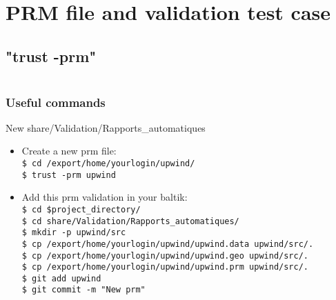\documentclass[10pt, hyperref={unicode=true,pdfusetitle, bookmarks=true,bookmarksnumbered=false,bookmarksopen=false, breaklinks=false,pdfborder={0 0 1},backref=true,colorlinks=true,linkcolor=darkblue,pageanchor, urlcolor=darkblue}]{beamer}
\begin{document}
\section{{\bf{PRM file and validation test case}}}
\subsection{{\bf{"trust -prm"}}}
\begin{frame}
\begin{columns}[c] 
\tableofcontents[sections={1-3},currentsection, currentsubsection]
\tableofcontents[sections={4-8},currentsection, currentsubsection]
\end{columns}
\end{frame}
\begin{frame}
\frametitle{Useful commands}
\begin{block}{New share/Validation/Rapports\_automatiques}
\begin{itemize}
\item Create a new prm file:\\
\texttt{\$ cd /export/home/yourlogin/upwind/}\\
\texttt{\$ trust -prm upwind}\\
\item Add this prm validation in your baltik:\\
\texttt{\$ cd \$project\_directory/}\\
\texttt{\$ cd share/Validation/Rapports\_automatiques/}\\
\texttt{\$ mkdir -p upwind/src}\\
\texttt{\$ cp /export/home/yourlogin/upwind/upwind.data upwind/src/.}\\
\texttt{\$ cp /export/home/yourlogin/upwind/upwind.geo upwind/src/.}\\
\texttt{\$ cp /export/home/yourlogin/upwind/upwind.prm upwind/src/.}\\
\texttt{\$ git add upwind}\\
\texttt{\$ git commit -m "New prm"}\\
\end{itemize}
\end{block}
\end{frame}
\end{document}
